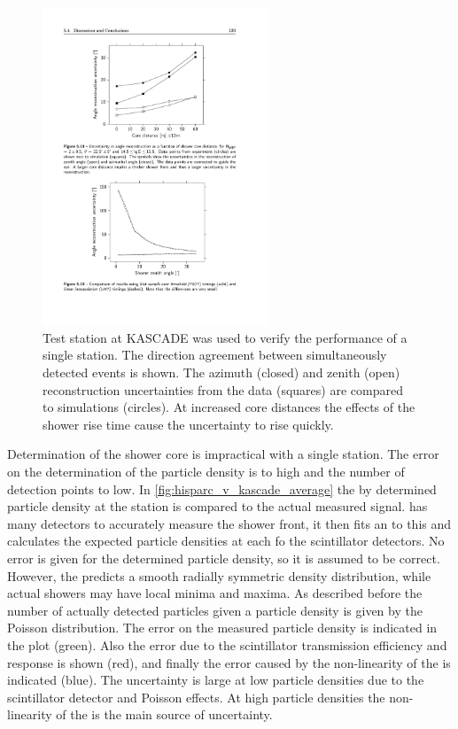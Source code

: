 \begin{figure}
    \centering
    \includegraphics[width=0.6\textwidth]
                    {plots/station/angle_kascade_core_distance}
    \caption{Test station at KASCADE was used to verify the performance of a single station. The direction agreement between simultaneously detected events is shown. The azimuth (closed) and zenith (open) reconstruction uncertainties from the data (squares) are compared to simulations (circles). At increased core distances the effects of the shower rise time cause the uncertainty to rise quickly.}
    \label{fig:angle_kascade_core_distance}
\end{figure}

Determination of the shower core is impractical with a single station. The error on the determination of the particle density is to high and the number of detection points to low. In \cref{fig:hisparc_v_kascade_average} the by \kascade determined particle density at the station is compared to the actual measured signal. \kascade has many detectors to accurately measure the shower front, it then fits an \ldf to this and calculates the expected particle densities at each fo the \hisparc scintillator detectors. No error is given for the \kascade determined particle density, so it is assumed to be correct. However, the \ldf predicts a smooth radially symmetric density distribution, while actual showers may have local minima and maxima. As described before the number of actually detected particles given a particle density is given by the Poisson distribution. The error on the measured particle density is indicated in the plot (green). Also the error due to the scintillator transmission efficiency and \pmt response is shown (red), and finally the error caused by the non-linearity of the \pmt is indicated (blue). The uncertainty is large at low particle densities due to the scintillator detector and Poisson effects. At high particle densities the non-linearity of the \pmt is the main source of uncertainty.

